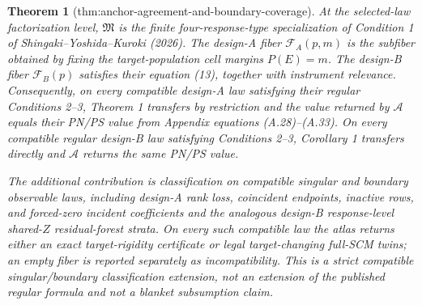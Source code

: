 \documentclass{article}
\newtheorem{theorem}{Theorem}
\begin{document}
\begin{theorem}[thm:anchor-agreement-and-boundary-coverage]\label{thm:anchor-agreement-and-boundary-coverage}
At the selected-law factorization level, \(\mathfrak M\) is the finite four-response-type specialization of Condition 1 of Shingaki--Yoshida--Kuroki (2026). The design-A fiber \(\mathcal F_A(p,m)\) is the subfiber obtained by fixing the target-population cell margins \(P(E)=m\). The design-B fiber \(\mathcal F_B(p)\) satisfies their equation (13), together with instrument relevance. Consequently, on every compatible design-A law satisfying their regular Conditions 2--3, Theorem 1 transfers by restriction and the value returned by \(\mathscr A\) equals their PN/PS value from Appendix equations (A.28)--(A.33). On every compatible regular design-B law satisfying Conditions 2--3, Corollary 1 transfers directly and \(\mathscr A\) returns the same PN/PS value.

The additional contribution is classification on compatible singular and boundary observable laws, including design-A rank loss, coincident endpoints, inactive rows, and forced-zero incident coefficients and the analogous design-B response-level shared-\(Z\) residual-forest strata. On every such compatible law the atlas returns either an exact target-rigidity certificate or legal target-changing full-SCM twins; an empty fiber is reported separately as incompatibility. This is a strict compatible singular/boundary classification extension, not an extension of the published regular formula and not a blanket subsumption claim.
\end{theorem}
\end{document}
